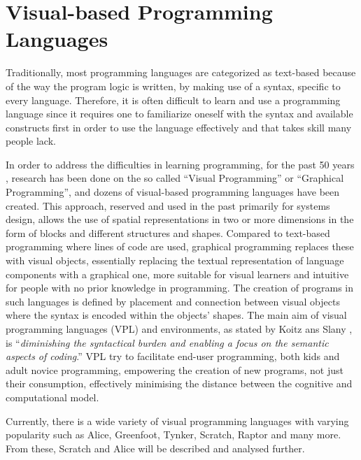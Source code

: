 \section{Visual-based Programming Languages}
\label{sec:visual_based_programming_languages}

Traditionally, most programming languages are categorized as text-based because of the way the program logic is written, by making use of a syntax, specific to every language. Therefore, it is often difficult to learn and use a programming language since it requires one to familiarize oneself with the syntax and available constructs first in order to use the language effectively and that takes skill many people lack. 

In order to address the difficulties in learning programming, for the past 50 years \cite{VisualProgHistory}, research has been done on the so called “Visual Programming” or “Graphical Programming”, and dozens of visual-based programming languages have been created. This approach, reserved and used in the past primarily for systems design, allows the use of spatial representations in two or more dimensions in the form of blocks and different structures and shapes. Compared to text-based programming where lines of code are used, graphical programming replaces these with visual objects, essentially replacing the textual representation of language components with a graphical one, more suitable for visual learners and intuitive for people with no prior knowledge in programming. The creation of programs in such languages is defined by placement and connection between visual objects where the syntax is encoded within the objects' shapes.  
The main aim of visual programming languages (VPL) and environments, as stated by Koitz ans Slany \cite{KoitzSlany14}, is “\textit{diminishing the syntactical burden and enabling a focus on the semantic aspects of coding}.” VPL try to facilitate end-user programming, both kids and adult novice programming, empowering the creation of new programs, not just their consumption, effectively minimising the distance between the cognitive and computational model.

Currently, there is a wide variety of visual programming languages with varying popularity such as Alice, Greenfoot, Tynker, Scratch, Raptor and many more. From these, Scratch and Alice will be described and analysed further.


